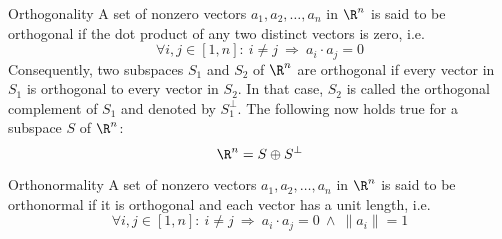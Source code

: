 \begin{theo}[Orthogonality]{Orthogonality}
    A set of nonzero vectors $a_1, a_2, \ldots, a_n$ in $\R^n$ is said to be orthogonal if the dot product of any two distinct vectors is zero, i\@.e\@.
    \begin{equation*}
        \forall i,j \in [1,n]: \ i \neq j \ \Rightarrow \ a_i \cdot a_j = 0
    \end{equation*}
    Consequently, two subspaces $S_1$ and $S_2$ of $\R^n$ are orthogonal if every vector in $S_1$ is orthogonal to every vector in $S_2$. In that case, $S_2$ is called the orthogonal complement of $S_1$ and denoted by $S_1^{\perp}$. The following now holds true for a subspace $S$ of $\R^n$:
    \begin{equation*}
        \R^n = S \oplus S^{\perp}
    \end{equation*}
    \vspace*{-0.5cm}
\end{theo}

\begin{theo}[Orthonormality]{Orthonormality}
    A set of nonzero vectors $a_1, a_2, \ldots, a_n$ in $\R^n$ is said to be orthonormal if it is orthogonal and each vector has a unit length, i\@.e\@.
    \begin{equation*}
        \forall i,j \in [1,n]: \ i \neq j \ \Rightarrow \ a_i \cdot a_j = 0 \ \land \ \|a_i\| = 1
    \end{equation*}
    \vspace*{-0.5cm}
\end{theo}